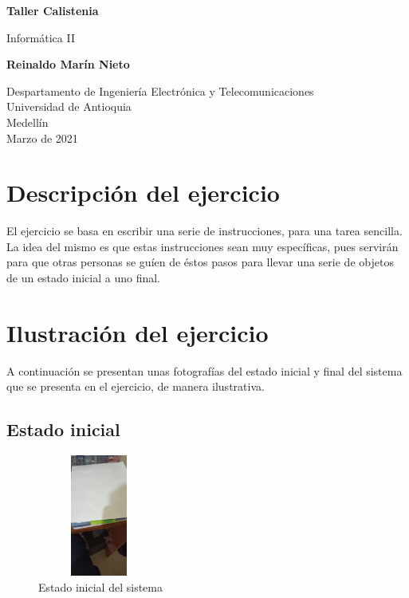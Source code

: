 \documentclass{article}
\begin{document}
\begin{titlepage}
    \begin{center}
        \vspace*{1cm}
            
        \Huge
        \textbf{Taller Calistenia}
            
        \vspace{0.5cm}
        \LARGE
        Informática II
            
        \vspace{1.5cm}
            
        \textbf{Reinaldo Marín Nieto}
            
        \vfill
            
        \vspace{0.8cm}
            
        \Large
        Despartamento de Ingeniería Electrónica y Telecomunicaciones\\
        Universidad de Antioquia\\
        Medellín\\
        Marzo de 2021
            
    \end{center}
\end{titlepage}

\tableofcontents
\newpage
\section{Descripción del ejercicio}\label{intro}
El ejercicio se basa en escribir una serie de instrucciones, para una tarea sencilla. La idea del mismo es que estas instrucciones sean muy específicas, pues servirán para que otras personas se guíen de éstos pasos para llevar una serie de objetos de un estado inicial a uno final.

\section{Ilustración del ejercicio} \label{contenido}
A continuación se presentan unas fotografías del estado inicial y final del sistema que se presenta en el ejercicio, de manera ilustrativa.
\subsection{Estado inicial}
\begin{figure}[h]
\includegraphics[width=4cm, height=4cm]{inicial.jpeg}
\centering
\caption{Estado inicial del sistema}
\label{fig:cpplogo}
\end{figure}
\end{document}
